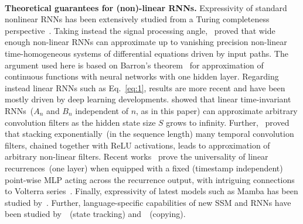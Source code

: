 \\[.35cm]
\textbf{Theoretical guarantees for (non)-linear RNNs.} Expressivity of standard nonlinear RNNs has been extensively studied from a Turing completeness perspective~\citep{siegelmann1992computational,korsky2019computational}. Taking instead the signal processing angle,~\citet{hanson2020universal} proved that wide enough non-linear RNNs can approximate up to vanishing precision non-linear time-homogeneous systems of differential equations driven by input paths. The argument used here is based on Barron's theorem~\citep{barron1993universal} for approximation of continuous functions with neural networks with one hidden layer. Regarding instead linear RNNs such as Eq.~\eqref{eq:1}, results are more recent and have been mostly driven by deep learning developments. \citet{li2022approximation} showed that linear time-invariant RNNs~($A_n$ and $B_n$ independent of $n$, as in this paper) can approximate arbitrary convolution filters as the hidden state size $S$ grows to infinity. Further,~\citet{hanson2019universal} proved that stacking exponentially~(in the sequence length) many temporal convolution filters, chained together with ReLU activations, leads to approximation of arbitrary non-linear filters. Recent works~\citep{orvieto2024universality,wang2024state} prove the universality of linear recurrences~(one layer) when equipped with a fixed (timestamp independent) point-wise MLP acting across the recurrence output, with intriguing connections to Volterra series~\citep{boyd1985fading}. Finally, expressivity of latest models such as Mamba has been studied by~\citep{cirone2024theoretical}. Further, language-specific capabilities of new SSM and RNNs have been studied by~\citet{merrill2024illusion}~(state tracking) and~\citet{jelassi2024repeat}~(copying). 
